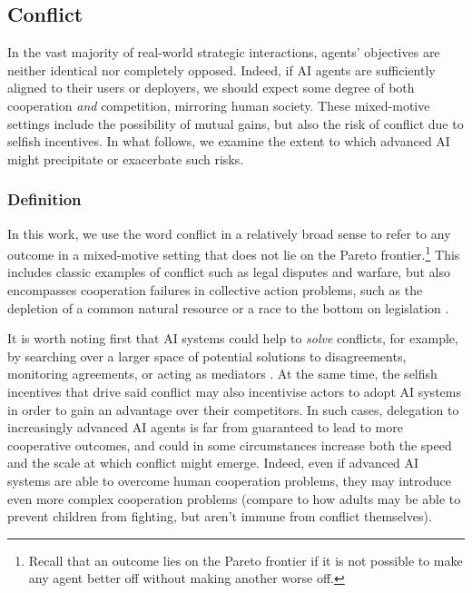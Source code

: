 \subsection{Conflict}
\label{sec:conflict}

In the vast majority of real-world strategic interactions, agents' objectives are neither identical nor completely opposed.
Indeed, if AI agents are sufficiently aligned to their users or deployers, we should expect some degree of both cooperation \textit{and} competition, mirroring human society.
These mixed-motive settings include the possibility of mutual gains, but also the risk of conflict due to selfish incentives.
In what follows, we examine the extent to which advanced AI might precipitate or exacerbate such risks. 

\subsubsection{Definition}

In this work, we use the word conflict in a relatively broad sense to refer to any outcome in a mixed-motive setting that does not lie on the Pareto frontier.\footnote{Recall that an outcome lies on the Pareto frontier if it is not possible to make any agent better off without making another worse off.}
This includes classic examples of conflict such as legal disputes and warfare, but also encompasses cooperation failures in collective action problems, such as the depletion of a common natural resource or a race to the bottom on legislation \citep{snyder1971prisoner, dawes1980social}.

It is worth noting first that AI systems could help to \emph{solve} conflicts, for example, by searching over a larger
space of potential solutions to disagreements, monitoring agreements, or acting as mediators 
\citep{Dafoe2020,bakker_fine-tuning_2022,mckee2023scaffolding,Small2023}.
At the same time, the selfish incentives that drive said conflict may also 
incentivise actors to adopt AI systems in order to gain an advantage over their competitors.
In such cases, delegation to increasingly advanced AI agents is far from guaranteed to lead to more cooperative outcomes, and could in some circumstances increase both the speed and the scale at which conflict might emerge.
Indeed, even if advanced AI systems are able to overcome human cooperation problems, they may introduce even more complex cooperation problems (compare to how adults may be able to prevent children from fighting, but aren't immune from conflict themselves).


